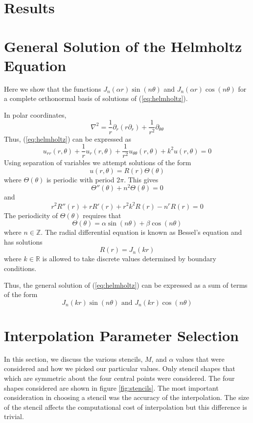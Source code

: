 \documentclass{report}
\begin{document}
\chapter{Results}

\appendix
\chapter{General Solution of the Helmholtz Equation}
\label{sec:helmholtz_basis}
Here we show that the functions $J_{n}(\alpha r) \sin(n \theta)$ and $J_{n}(\alpha r) \cos(n \theta)$ for a complete orthonormal basis of solutions of (\ref{eq:helmholtz}).

In polar coordinates,
\[
\nabla^{2} = \frac{1}{r} \partial_{r} (r \partial_{r}) + \frac{1}{r^{2}} \partial_{\theta \theta}
\]
Thus, (\ref{eq:helmholtz}) can be expressed as
\[
u_{rr}(r, \theta) + \frac{1}{r} u_{r}(r, \theta) + \frac{1}{r^{2}} u_{\theta \theta}(r, \theta) + k^2 u(r, \theta) = 0
\]
Using separation of variables we attempt solutions of the form
\[
u(r, \theta) = R(r) \Theta(\theta)
\]
where $\Theta(\theta)$ is periodic with period $2 \pi$. This gives
\[
\Theta''(\theta) + n^{2} \Theta(\theta) = 0
\]
and
\[
r^{2} R''(r) + r R'(r) + r^{2} k^{2} R(r) - n^{r} R(r) = 0
\]
The periodicity of $\Theta(\theta)$ requires that
\[
\Theta(\theta) = \alpha \sin(n \theta) + \beta \cos(n \theta)
\]
where $n \in \mathbb{Z}$.
The radial differential equation is known as Bessel's equation and has solutions
\[
R(r) = J_{n}(k r)
\]
where $k \in \mathbb{R}$ is allowed to take discrete values determined by boundary conditions.

Thus, the general solution of (\ref{eq:helmholtz}) can be expressed as a sum of terms of the form
\[
J_{n}(k r) \sin(n \theta) \text{ and } J_{n}(k r) \cos(n \theta)
\]

\chapter{Interpolation Parameter Selection}
\label{sec:params}
In this section, we discuss the various stencils, $M$, and $\alpha$ values that were considered and how we picked our particular values.
Only stencil shapes that which are symmetric about the four central points were considered. The four shapes considered are shown in figure \ref{fig:stencils}. The most important consideration in choosing a stencil was the accuracy of the interpolation. The size of the stencil affects the computational cost of interpolation but this difference is trivial.
\end{document}
